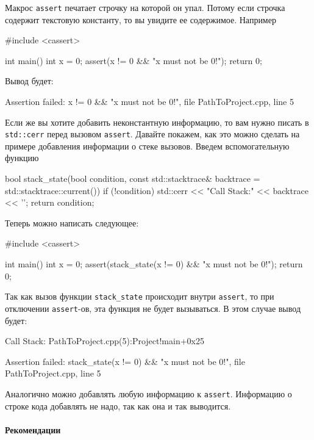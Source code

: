 Макрос \verb"assert" печатает строчку на которой он упал.
Потому если строчка содержит текстовую константу, то вы увидите ее содержимое.
Например
\begin{cppcode}
#include <cassert>

int main() {
  int x = 0;
  assert(x != 0 && "x must not be 0!");
  return 0;
}
\end{cppcode}
Вывод будет:
\begin{cppcode}
Assertion failed: x != 0 && "x must not be 0!", file PathToProject\main.cpp, line 5
\end{cppcode}
Если же вы хотите добавить неконстантную информацию, то вам нужно писать в \verb"std::cerr" перед вызовом \verb"assert".
Давайте покажем, как это можно сделать на примере добавления информации о стеке вызовов.
Введем вспомогательную функцию
\begin{cppcode}
bool stack_state(bool condition, const std::stacktrace& backtrace = std::stacktrace::current()) {
  if (!condition)
    std::cerr << "Call Stack:\n" << backtrace << '\n';
  return condition;
}
\end{cppcode}
Теперь можно написать следующее:
\begin{cppcode}
#include <cassert>

int main() {
  int x = 0;
  assert(stack_state(x != 0) && "x must not be 0!");
  return 0;
}
\end{cppcode}
Так как вызов функции \verb"stack_state" происходит внутри \verb"assert", то при отключении \verb"assert"-ов, эта функция не будет вызываться.
В этом случае вывод будет:
\begin{cppcode}
Call Stack:
PathToProject\main.cpp(5):Project!main+0x25

Assertion failed: stack_state(x != 0) && "x must not be 0!",
file PathToProject\main.cpp, line 5
\end{cppcode}
Аналогично можно добавлять любую информацию к \verb"assert".
Информацию о строке кода добавлять не надо, так как она и так выводится.

\paragraph{Рекомендации}


